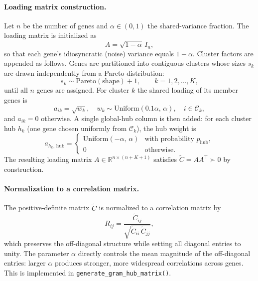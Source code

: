 \paragraph{Loading matrix construction.}
Let $n$ be the number of genes and $\alpha \in (0,1)$ the shared-variance fraction.
The loading matrix is initialized as
\begin{equation}
  A = \sqrt{1-\alpha}\,I_n,
\end{equation}
so that each gene's idiosyncratic (noise) variance equals $1-\alpha$.
Cluster factors are appended as follows.
Genes are partitioned into contiguous clusters whose sizes $s_k$ are drawn
independently from a Pareto distribution:
\begin{equation}
  s_k \sim \mathrm{Pareto}(\text{shape}) + 1, \qquad k = 1, 2, \ldots, K,
\end{equation}
until all $n$ genes are assigned.
For cluster $k$ the shared loading of its member genes is
\begin{equation}
  a_{ik} = \sqrt{w_k}, \quad w_k \sim \mathrm{Uniform}(0.1\alpha,\,\alpha),
  \quad i \in \mathcal{C}_k,
\end{equation}
and $a_{ik} = 0$ otherwise.
A single global-hub column is then added: for each cluster hub $h_k$
(one gene chosen uniformly from $\mathcal{C}_k$), the hub weight is
\begin{equation}
  a_{h_k,\,\mathrm{hub}} =
  \begin{cases}
    \mathrm{Uniform}(-\alpha,\,\alpha) & \text{with probability } p_\mathrm{hub}, \\
    0 & \text{otherwise.}
  \end{cases}
\end{equation}
The resulting loading matrix $A \in \mathbb{R}^{n \times (n + K + 1)}$ satisfies
$\tilde{C} = AA^\top \succ 0$ by construction.

\paragraph{Normalization to a correlation matrix.}
The positive-definite matrix $\tilde{C}$ is normalized to a correlation matrix by
\begin{equation}
  R_{ij} = \frac{\tilde{C}_{ij}}{\sqrt{\tilde{C}_{ii}\,\tilde{C}_{jj}}},
\end{equation}
which preserves the off-diagonal structure while setting all diagonal entries to unity.
The parameter $\alpha$ directly controls the mean magnitude of the off-diagonal entries:
larger $\alpha$ produces stronger, more widespread correlations across genes.
This is implemented in \texttt{generate\_gram\_hub\_matrix()}.

